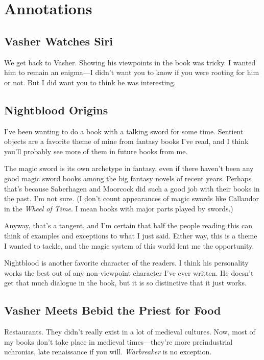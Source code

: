 \section*{Annotations}

\subsection*{Vasher Watches Siri}

We get back to Vasher. Showing his viewpoints in the book was tricky. I wanted him to remain an enigma—I didn’t want you to know if you were rooting for him or not. But I did want you to think he was interesting.

\subsection*{Nightblood Origins}

I’ve been wanting to do a book with a talking sword for some time. Sentient objects are a favorite theme of mine from fantasy books I’ve read, and I think you’ll probably see more of them in future books from me.

The magic sword is its own archetype in fantasy, even if there haven’t been any good magic sword books among the big fantasy novels of recent years. Perhaps that’s because Saberhagen and Moorcock did such a good job with their books in the past. I’m not sure. (I don’t count appearances of magic swords like Callandor in the \textit{Wheel of Time}. I mean books with major parts played by swords.)

Anyway, that’s a tangent, and I’m certain that half the people reading this can think of examples and exceptions to what I just said. Either way, this is a theme I wanted to tackle, and the magic system of this world lent me the opportunity.

Nightblood is another favorite character of the readers. I think his personality works the best out of any non-viewpoint character I’ve ever written. He doesn’t get that much dialogue in the book, but it is so distinctive that it just works.

\subsection*{Vasher Meets Bebid the Priest for Food}

Restaurants. They didn’t really exist in a lot of medieval cultures. Now, most of my books don’t take place in medieval times—they’re more preindustrial uchronias, late renaissance if you will. \textit{Warbreaker} is no exception.

